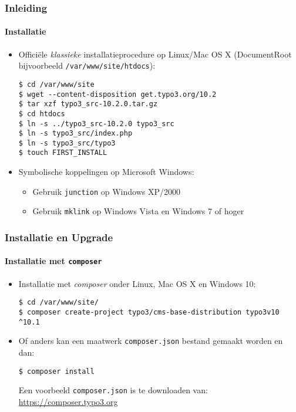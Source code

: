 
\begin{frame}[fragile]
	\frametitle{Inleiding}
	\framesubtitle{Installatie}

	\begin{itemize}
		\item Offici\"ele \textit{klassieke} installatieprocedure op Linux/Mac OS X\newline
		(DocumentRoot bijvoorbeeld \texttt{/var/www/site/htdocs}):
\begin{lstlisting}
$ cd /var/www/site
$ wget --content-disposition get.typo3.org/10.2
$ tar xzf typo3_src-10.2.0.tar.gz
$ cd htdocs
$ ln -s ../typo3_src-10.2.0 typo3_src
$ ln -s typo3_src/index.php
$ ln -s typo3_src/typo3
$ touch FIRST_INSTALL
\end{lstlisting}

		\item Symbolische koppelingen op Microsoft Windows:

			\begin{itemize}
				\item Gebruik \texttt{junction} op Windows XP/2000
				\item Gebruik \texttt{mklink} op Windows Vista en Windows 7 of hoger
			\end{itemize}

	\end{itemize}
\end{frame}


\begin{frame}[fragile]
	\frametitle{Installatie en Upgrade}
	\framesubtitle{Installatie met \texttt{composer}}

	\begin{itemize}
		\item Installatie met \textit{composer} onder Linux, Mac OS X en Windows 10:

\begin{lstlisting}
$ cd /var/www/site/
$ composer create-project typo3/cms-base-distribution typo3v10 ^10.1
\end{lstlisting}

		\item Of anders kan een maatwerk \texttt{composer.json} bestand gemaakt worden en dan:

\begin{lstlisting}
$ composer install
\end{lstlisting}

			Een voorbeeld \texttt{composer.json} is te downloaden van:\newline
			\smaller
				\href{https://composer.typo3.org}{https://composer.typo3.org}
			\normalsize

	\end{itemize}
\end{frame}

